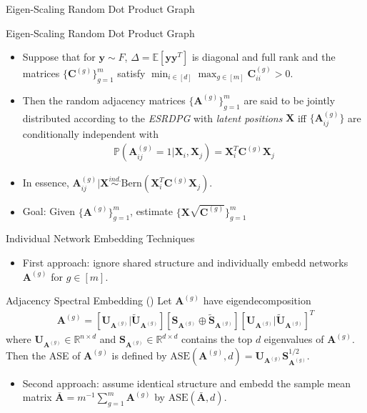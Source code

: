 \documentclass[handout]{beamer}
\newcommand{\bvar}[1]{\mathbf{#1}}
\begin{document}
\begin{frame}{Eigen-Scaling Random Dot Product Graph}
    \begin{block}{Eigen-Scaling Random Dot Product Graph}
    \begin{itemize}
    \item Suppose that for $\bvar{y}\sim F$, $\Delta = \mathbb{E}[\bvar{yy}^T]$ is diagonal and full rank and the matrices $\{\bvar{C}^{(g)}\}_{g=1}^m$ satisfy $\min_{i\in[d]}\max_{g\in[m]}\bvar{C}^{(g)}_{ii} > 0$.\pause
    \item Then the random adjacency matrices $\{\bvar{A}^{(g)}\}_{g=1}^m $ are said to be jointly distributed according to the \textit{ESRDPG} with \textit{latent positions} $\bvar{X}$ iff $\{\bvar{A}_{ij}^{(g)}\}$ are conditionally independent with 
    \begin{align*}
        \mathbb{P}(\bvar{A}_{ij}^{(g)} = 1|\bvar{X}_i, \bvar{X}_j) = \bvar{X}_i^T\bvar{C}^{(g)}\bvar{X}_j
    \end{align*}
    \end{itemize}
    \end{block}\pause
    \begin{itemize}
        \item In essence, $\bvar{A}_{ij}^{(g)}|\bvar{X}\overset{ind.}{\sim} \text{Bern}(\bvar{X}_i^T\bvar{C}^{(g)}\bvar{X}_j)$. \pause
        \item Goal: Given $\{\bvar{A}^{(g)}\}_{g=1}^m$, estimate $\{\bvar{X}\sqrt{\bvar{C}^{(g)}}\}_{g=1}^m$
    \end{itemize}
\end{frame}


\begin{frame}{Individual Network Embedding Techniques}
\begin{itemize}
    \item First approach: ignore shared structure and individually embedd networks $\bvar{A}^{(g)}$ for $g\in[m]$.\pause
\end{itemize}
    \begin{block}{Adjacency Spectral Embedding (\cite{ASE})}
        Let $\bvar{A}^{(g)}$ have eigendecomposition 
        \begin{align*}
            \bvar{A}^{(g)} = [\bvar{U}_{\bvar{A}^{(g)}}|\tilde{\bvar{U}}_{\bvar{A}^{(g)}}][\bvar{S}_{\bvar{A}^{(g)}}\oplus \tilde{\bvar{S}}_{\bvar{A}^{(g)}}][\bvar{U}_{\bvar{A}^{(g)}}|\tilde{\bvar{U}}_{\bvar{A}^{(g)}}]^T
        \end{align*}
        where $\bvar{U}_{\bvar{A}^{(g)}}\in\mathbb{R}^{n\times d}$ and $\bvar{S}_{\bvar{A}^{(g)}}\in\mathbb{R}^{d\times d}$ contains the top $d$ eigenvalues of $\bvar{A}^{(g)}$. Then the ASE of $\bvar{A}^{(g)}$ is defined by $\text{ASE}(\bvar{A}^{(g)},d) = \bvar{U}_{\bvar{A}^{(g)}}\bvar{S}_{\bvar{A}^{(g)}}^{1/2}$.
        \end{block}
    \begin{itemize}
    \item Second approach: assume identical structure and embedd the sample mean matrix $\bar{\bvar{A}} =  m^{-1}\sum_{g=1}^m \bvar{A}^{(g)}$ by $\text{ASE}(\bar{\bvar{A}}, d)$. 
\end{itemize}
\end{frame}
\end{document}
